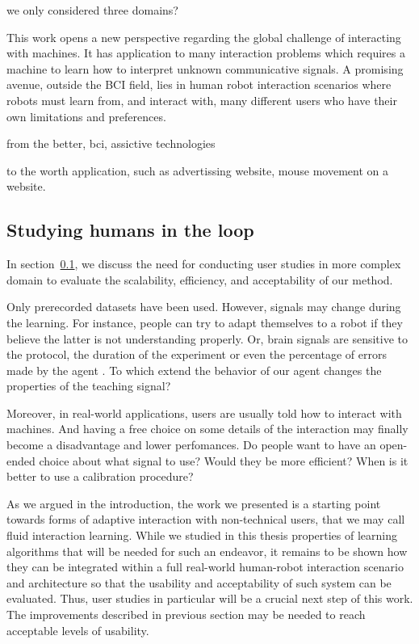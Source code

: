 we only considered three domains?

This work opens a new perspective regarding the global challenge of interacting with machines. It has application to many interaction problems which requires a machine to learn how to interpret unknown communicative signals. A promising avenue, outside the BCI field, lies in human robot interaction scenarios where robots must learn from, and interact with, many different users who have their own limitations and preferences.

from the better, bci, assictive technologies

to the worth application, such as advertissing website, mouse movement on a website.

\subsection{Studying humans in the loop}
\label{chapter:limitations:userstudies}


In section~\ref{chapter:limitations:userstudies}, we discuss the need for conducting user studies in more complex domain to evaluate the scalability, efficiency, and acceptability of our method.

Only prerecorded datasets have been used. However, signals may change during the learning. For instance, people can try to adapt themselves to a robot if they believe the latter is not understanding properly. Or, brain signals are sensitive to the protocol, the duration of the experiment or even the percentage of errors made by the agent \cite{chavarriaga2010learning}. To which extend the behavior of our agent changes the properties of the teaching signal? 

Moreover, in real-world applications, users are usually told how to interact with machines. And having a free choice on some details of the interaction may finally become a disadvantage and lower perfomances. Do people want to have an open-ended choice about what signal to use? Would they be more efficient? When is it better to use a calibration procedure?

As we argued in the introduction, the work we presented is a starting point towards forms of adaptive interaction with non-technical users, that we may call fluid interaction learning. While we studied in this thesis properties of learning algorithms that will be needed for such an endeavor, it remains to be shown how they can be integrated within a full real-world human-robot interaction scenario and architecture so that the usability and acceptability of such system can be evaluated. Thus, user studies in particular will be a crucial next step of this work. The improvements described in previous section may be needed to reach acceptable levels of usability.

